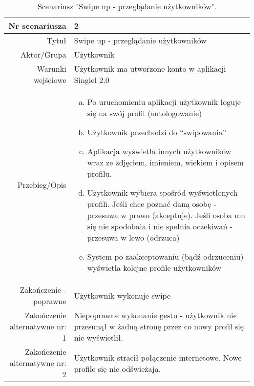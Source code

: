 \documentclass[12pt,a4paper]{article}
\begin{document}
\begin{table} [H]
\centering
\begin{tabular}{|r|p{9cm}|} \hline
Nr scenariusza & 2 \\
\hline
Tytuł & Swipe up - przeglądanie użytkowników \\
\hline
Aktor/Grupa & Użytkownik \\
\hline
Warunki wejściowe & Użytkownik ma utworzone konto w aplikacji Singiel 2.0  \\
\hline
Przebieg/Opis & 
\begin{enumerate}[a)]
\item Po uruchomieniu aplikacji użytkownik loguje się na swój profil (autologowanie)
\item Użytkownik przechodzi do “swipowania”
\item Aplikacja wyświetla innych użytkowników wraz ze zdjęciem, imieniem, wiekiem i opisem profilu.
\item Użytkownik wybiera spośród wyświetlonych profili. Jeśli chce poznać daną osobę - przesuwa w prawo (akceptuje). Jeśli osoba mu się nie spodobała i nie spełnia oczekiwań - przesuwa w lewo (odrzuca)
\item System po zaakceptowaniu (bądź odrzuceniu) wyświetla kolejne profile użytkowników 


\end{enumerate}
\\
\hline
Zakończenie - poprawne & Użytkownik wykonuje swipe
\\ 
\hline
Zakończenie alternatywne nr: 1 & Niepoprawne wykonanie gestu - użytkownik nie przesunął w żadną stronę przez co nowy profil się nie wyświetlił.
\\
\hline
Zakończenie alternatywne nr: 2 & Użytkownik stracił połączenie internetowe. Nowe profile się nie odświeżają. 
\\

\hline
\end{tabular}
\caption{Scenariusz "Swipe up - przeglądanie użytkowników".}
\label{table:2}
\end{table}
\end{document}
